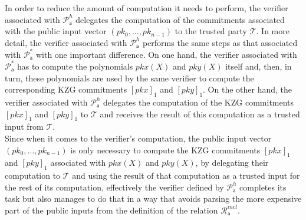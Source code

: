 \noindent In order to reduce the amount of computation it needs to perform, the verifier associated with $\mathscr{P}^{h}_{\mathsf{a}}$ 
delegates the computation of the commitments associated with the public input vector $(pk_0, \ldots, pk_{n-1})$ to the trusted party $\mathcal{T}$. 
In more detail, the verifier associated with $\mathscr{P}^{h}_{\mathsf{a}}$ performs the same steps as that associated with 
$\mathscr{P}^{*}_{\mathsf{a}}$ with one important difference. On one hand, the verifier associated with $\mathscr{P}^{*}_{\mathsf{a}}$ has to compute 
the polynomials $pkx(X)$ and $pky(X)$ itself and, then, in turn, these polynomials are used by the same verifier to compute the corresponding 
KZG commitments $[pkx]_{1}$ and $[pky]_{1}$. On the other hand, the verifier associated with $\mathscr{P}^{h}_{\mathsf{a}}$ 
delegates the computation of the KZG commitments $[pkx]_{1}$ and $[pky]_{1}$ to $\mathcal{T}$ and receives the result of this computation 
as a trusted input from $\mathcal{T}$.\\

\noindent Since when it comes to the verifier's computation, the public input vector $(pk_0, \ldots, pk_{n-1})$ is only necessary to compute the 
KZG commitments $[pkx]_{1}$ and $[pky]_{1}$ associated with $pkx(X)$ and $pky(X)$, by delegating their computation to $\mathcal{T}$ and using 
the result of that computation as a trusted input for the rest of its computation, effectively the verifier defined by $\mathscr{P}^{h}_{\mathsf{a}}$ completes 
its task but also manages to do that in a way that avoids parsing the more expensive part of the public inputs from the definition of the relation 
$\mathcal{R}^{\mathit{incl}}_{\mathsf{a}}$. 